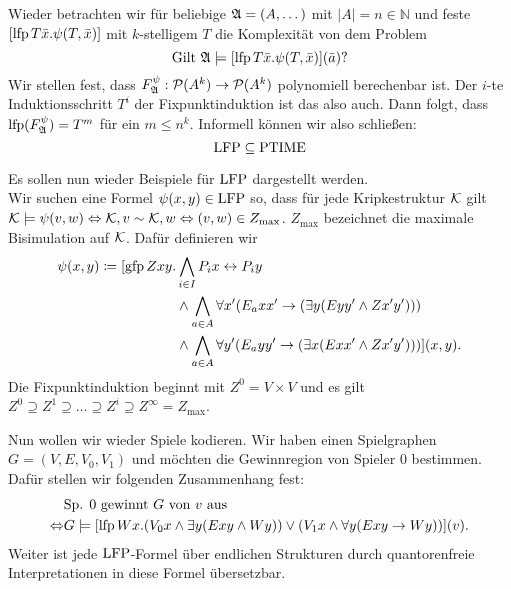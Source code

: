 Wieder betrachten wir für beliebige $\mathfrak{A}=(A,\dots)$ mit $\vert A\vert=n\in \mathbb{N}$ und feste $[\operatorname{lfp} T\bar{x}.\psi(T,\bar{x})]$ mit $k$-stelligem $T$ die Komplexität von dem Problem
\[\text{Gilt } \mathfrak{A}\models [\operatorname{lfp} T\bar{x}.\psi(T,\bar{x})](\bar{a})?\]
Wir stellen fest, dass $F^\psi_{\mathfrak{A}}:\mathcal{P}(A^k)\to\mathcal{P}(A^k)$ polynomiell berechenbar ist. Der $i$-te Induktionsschritt $T^i$ der Fixpunktinduktion ist das also auch. Dann folgt, dass $\operatorname{lfp}(F^\psi_{\mathfrak{A}})=T^m$ für ein $m\leq n^k$. Informell können wir also schließen:
\[\operatorname{LFP} \subseteq \operatorname{PTIME}\]

\begin{example}
	Es sollen nun wieder Beispiele für $\operatorname{LFP}$ dargestellt werden.
	\\
	Wir suchen eine Formel $\psi(x,y)\in \operatorname{LFP}$ so, dass für jede Kripkestruktur $\mathcal{K}$ gilt $\mathcal{K}\models \psi(v,w)\Leftrightarrow \mathcal{K},v \sim \mathcal{K},w \Leftrightarrow (v,w)\in Z_{\max}$. $Z_{\max}$ bezeichnet die maximale Bisimulation auf $\mathcal{K}$. Dafür definieren wir
	\begin{align*}
		\psi(x,y)\coloneqq [\operatorname{gfp} Zxy . &\bigwedge_{i\in I} P_ix\leftrightarrow P_iy\\
		&\land \bigwedge_{a\in A} \forall x'(E_a x x' \rightarrow (\exists y (Ey y' \land Zx'y')))\\
		&\land \bigwedge_{a\in A} \forall y'(E_a y y' \rightarrow (\exists x (Ex x' \land Zx'y')))](x,y).
	\end{align*}
	Die Fixpunktinduktion beginnt mit $Z^0=V\times V$ und es gilt $Z^0\supseteq Z^1\supseteq \dots \supseteq Z^i \supseteq Z^\infty = Z_{\max}$.
	
	Nun wollen wir wieder Spiele kodieren. Wir haben einen Spielgraphen $G=(V,E,V_0,V_1)$ und möchten die Gewinnregion von Spieler $0$ bestimmen. Dafür stellen wir folgenden Zusammenhang fest:
	\begin{align*}
	&\text{Sp. } 0 \text{ gewinnt } G \text{ von } v \text{ aus}\\
	\Leftrightarrow &G\models [\operatorname{lfp} Wx.(V_0x\land \exists y (Exy \land Wy)) \lor(V_1 x \land \forall y (Exy \rightarrow Wy))](v).
	\end{align*}
	Weiter ist jede $\operatorname{LFP}$-Formel über endlichen Strukturen durch quantorenfreie Interpretationen in diese Formel \glqq übersetzbar\grqq.
\end{example}

